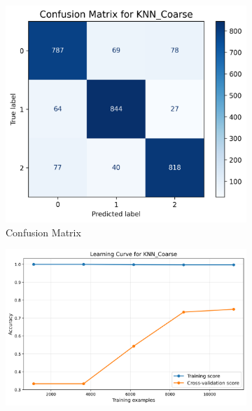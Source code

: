 \documentclass[10pt]{article}
\begin{document}
    \begin{figure}[!ht]
        \begin{subfigure}{0.33\textwidth}
            \centering
            \includegraphics[width=\textwidth]{code/ResultsMainAugZip/plots/Block1_Tree_Based_Experiment_I/confusion_matrix_KNN_Coarse.png}
            \caption{Confusion Matrix}
        \end{subfigure}
        \begin{subfigure}{0.33\textwidth}
            \centering
            \includegraphics[width=\textwidth]{code/ResultsMainAugZip/plots/Block1_Tree_Based_Experiment_I/learning_curve_KNN_Coarse.png}

\end{subfigure}
\end{figure}
\end{document}
